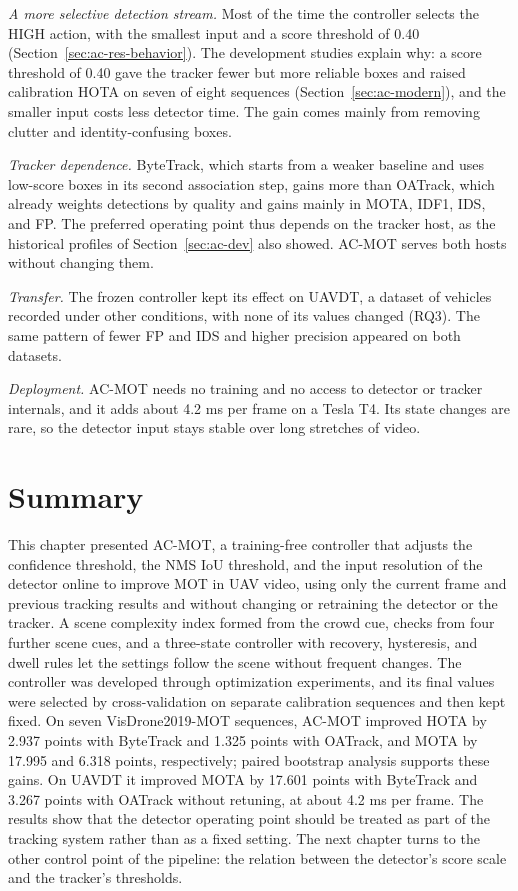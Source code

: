 \emph{A more selective detection stream.} Most of the time the controller selects the HIGH action, with the smallest input and a score threshold of 0.40 (Section~\ref{sec:ac-res-behavior}). The development studies explain why: a score threshold of 0.40 gave the tracker fewer but more reliable boxes and raised calibration HOTA on seven of eight sequences (Section~\ref{sec:ac-modern}), and the smaller input costs less detector time. The gain comes mainly from removing clutter and identity-confusing boxes.

\emph{Tracker dependence.} ByteTrack, which starts from a weaker baseline and uses low-score boxes in its second association step, gains more than OATrack, which already weights detections by quality and gains mainly in MOTA, IDF1, IDS, and FP. The preferred operating point thus depends on the tracker host, as the historical profiles of Section~\ref{sec:ac-dev} also showed. AC-MOT serves both hosts without changing them.

\emph{Transfer.} The frozen controller kept its effect on UAVDT, a dataset of vehicles recorded under other conditions, with none of its values changed (RQ3). The same pattern of fewer FP and IDS and higher precision appeared on both datasets.

\emph{Deployment.} AC-MOT needs no training and no access to detector or tracker internals, and it adds about 4.2 ms per frame on a Tesla T4. Its state changes are rare, so the detector input stays stable over long stretches of video.

\section{Summary}\label{sec:ac-summary}
This chapter presented AC-MOT, a training-free controller that adjusts the confidence threshold, the NMS IoU threshold, and the input resolution of the detector online to improve MOT in UAV video, using only the current frame and previous tracking results and without changing or retraining the detector or the tracker. A scene complexity index formed from the crowd cue, checks from four further scene cues, and a three-state controller with recovery, hysteresis, and dwell rules let the settings follow the scene without frequent changes. The controller was developed through optimization experiments, and its final values were selected by cross-validation on separate calibration sequences and then kept fixed. On seven VisDrone2019-MOT sequences, AC-MOT improved HOTA by 2.937 points with ByteTrack and 1.325 points with OATrack, and MOTA by 17.995 and 6.318 points, respectively; paired bootstrap analysis supports these gains. On UAVDT it improved MOTA by 17.601 points with ByteTrack and 3.267 points with OATrack without retuning, at about 4.2 ms per frame. The results show that the detector operating point should be treated as part of the tracking system rather than as a fixed setting. The next chapter turns to the other control point of the pipeline: the relation between the detector's score scale and the tracker's thresholds.
